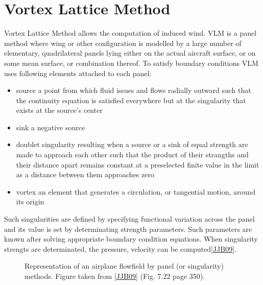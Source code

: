 \documentclass[a4paper,12pt,english]{jupyterBook}
\begin{document}
\part{Vortex Lattice Method}
\label{\detokenize{chapters/description/theory:vortex-lattice-method}}
\sphinxAtStartPar
Vortex Lattice Method allows the computation of induced wind. VLM is a panel method where wing or other configuration is modelled by a large number of elementary, quadrilateral panels lying either on the actual aircraft surface, or on some mean surface, or combination thereof. To satisfy boundary conditions VLM uses following elements attached to each panel:
\begin{itemize}
\item {} 
\sphinxAtStartPar
source \sphinxhyphen{} a point from which fluid issues and flows radially outward such that the continuity equation is satisfied everywhere but at the singularity that exists at the source’s center

\item {} 
\sphinxAtStartPar
sink \sphinxhyphen{} a negative source

\item {} 
\sphinxAtStartPar
doublet \sphinxhyphen{}  singularity resulting when a source or a sink of equal strength are made to approach each other such that the product of their strangths and their distance apart remains constant at a preselected finite value in the limit as a distance between them approaches zero

\item {} 
\sphinxAtStartPar
vortex \sphinxhyphen{} an element that generates a circulation, or tangential motion, around its origin

\end{itemize}

\sphinxAtStartPar
Such singularities are defined by specifying functional variation across the panel and its value is set by determinating strength parameters. Such parameters are known after solving appropriate boundary condition equations. When singularity strengts are determinated, the pressure, velocity can be computed{[}\hyperlink{cite.chapters/bibliography:id5}{JJB09}{]}.

\begin{figure}[htbp]
\centering
\capstart

\noindent{}
\caption{Representation of an airplane flowfield by panel (or singularity) methods. Figure taken from {[}\hyperlink{cite.chapters/bibliography:id5}{JJB09}{]} (Fig. 7.22 page 350).}\label{\detokenize{chapters/description/theory:panel-method}}\end{figure}
\end{document}
